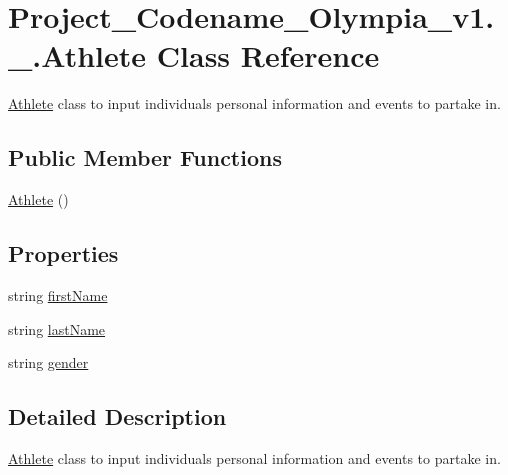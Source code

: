\hypertarget{classProject__Codename__Olympia__v1_1_1__0_1_1Athlete}{}\section{Project\+\_\+\+Codename\+\_\+\+Olympia\+\_\+v1.\+\_.\+Athlete Class Reference}
\label{classProject__Codename__Olympia__v1_1_1__0_1_1Athlete}


\hyperlink{classProject__Codename__Olympia__v1_1_1__0_1_1Athlete}{Athlete} class to input individual\textquotesingle{}s personal information and events to partake in.  


\subsection*{Public Member Functions}
\begin{DoxyCompactItemize}
\item 
\hyperlink{classProject__Codename__Olympia__v1_1_1__0_1_1Athlete_a9f7a395fab9d43787087a2041a4b7507}{Athlete} ()
\end{DoxyCompactItemize}
\subsection*{Properties}
\begin{DoxyCompactItemize}
\item 
string \hyperlink{classProject__Codename__Olympia__v1_1_1__0_1_1Athlete_a2aff06b4778db2b8c2574b68cfdca6b6}{first\+Name}
\item 
string \hyperlink{classProject__Codename__Olympia__v1_1_1__0_1_1Athlete_a406e55fe8ee98f331effe28eb7d6bd8a}{last\+Name}
\item 
string \hyperlink{classProject__Codename__Olympia__v1_1_1__0_1_1Athlete_af3549b001122e0e0a9bc9cbef7880d5a}{gender}
\end{DoxyCompactItemize}


\subsection{Detailed Description}
\hyperlink{classProject__Codename__Olympia__v1_1_1__0_1_1Athlete}{Athlete} class to input individual\textquotesingle{}s personal information and events to partake in. 

